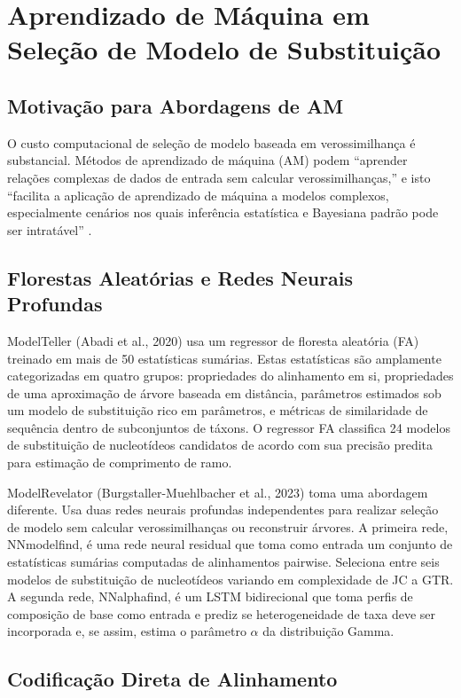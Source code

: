 \section{Aprendizado de Máquina em Seleção de Modelo de Substituição}

\subsection{Motivação para Abordagens de AM}

O custo computacional de seleção de modelo baseada em verossimilhança é substancial. Métodos de aprendizado de máquina (AM) podem ``aprender relações complexas de dados de entrada sem calcular verossimilhanças,'' e isto ``facilita a aplicação de aprendizado de máquina a modelos complexos, especialmente cenários nos quais inferência estatística e Bayesiana padrão pode ser intratável'' \parencite{mo2024}.

\subsection{Florestas Aleatórias e Redes Neurais Profundas}

ModelTeller (Abadi et al., 2020) usa um regressor de floresta aleatória (FA) treinado em mais de 50 estatísticas sumárias. Estas estatísticas são amplamente categorizadas em quatro grupos: propriedades do alinhamento em si, propriedades de uma aproximação de árvore baseada em distância, parâmetros estimados sob um modelo de substituição rico em parâmetros, e métricas de similaridade de sequência dentro de subconjuntos de táxons. O regressor FA classifica 24 modelos de substituição de nucleotídeos candidatos de acordo com sua precisão predita para estimação de comprimento de ramo.

ModelRevelator (Burgstaller-Muehlbacher et al., 2023) toma uma abordagem diferente. Usa duas redes neurais profundas independentes para realizar seleção de modelo sem calcular verossimilhanças ou reconstruir árvores. A primeira rede, NNmodelfind, é uma rede neural residual que toma como entrada um conjunto de estatísticas sumárias computadas de alinhamentos pairwise. Seleciona entre seis modelos de substituição de nucleotídeos variando em complexidade de JC a GTR. A segunda rede, NNalphafind, é um LSTM bidirecional que toma perfis de composição de base como entrada e prediz se heterogeneidade de taxa deve ser incorporada e, se assim, estima o parâmetro $\alpha$ da distribuição Gamma.

\subsection{Codificação Direta de Alinhamento}

